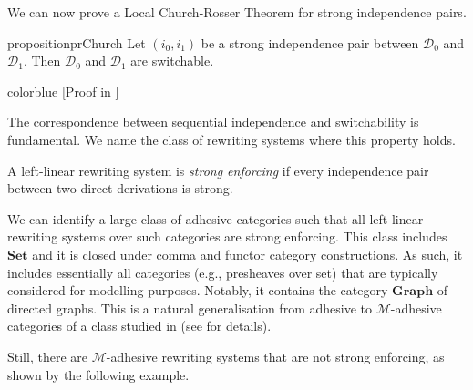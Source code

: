 \documentclass[a4paper,UKenglish,cleveref,pdftex,thm-restate,numberwithinsect]{lipics-v2021}
\newcommand{\full}[1]{{color{blue}#1}}
\newcommand{\full}[1]{}
\newcommand{\cat}[1]{\ensuremath{\mathbf{#1}}}
\newcommand{\dder}[1]{\mathscr{#1}}
\begin{document}


We can now prove a Local Church-Rosser Theorem for strong independence pairs.


\begin{restatable}{proposition}{prChurch}
  \label{pr:church}
  Let $(i_0, i_1)$ be a strong independence pair
  between $\dder{D}_0$ and $\dder{D}_1$. Then $\dder{D}_0$ and
  $\dder{D}_1$ are switchable.
\end{restatable}
\full{
  [Proof in ]
}

The correspondence between sequential independence and switchability
is fundamental. We name the class of rewriting systems where this property holds.

\begin{definition}
  A left-linear rewriting system is \emph{strong enforcing} if
  every independence pair between two direct derivations is strong.
\end{definition}

We can identify a large class of adhesive categories such that all
left-linear rewriting systems over such categories are strong
enforcing. This class includes $\cat{Set}$ and it is closed
under comma and functor category constructions.  As such, it includes
essentially all categories (e.g., presheaves over set) that are
typically considered for modelling purposes. Notably, it contains the
category $\cat{Graph}$ of directed graphs.
This is a natural generalisation from adhesive to $\mathcal{M}$-adhesive categories of a class studied in \cite{baldan2011adhesivity} (see  for details).

Still, there are $\mathcal{M}$-adhesive rewriting systems that are not strong enforcing, as shown by the following example.
\end{document}
